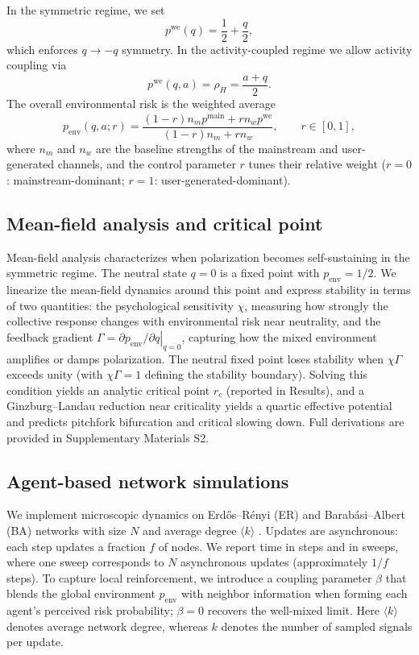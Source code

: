 \documentclass[11pt]{article}
\begin{document}
In the symmetric regime, we set
\begin{equation}
p^{\text{we}}(q)=\frac{1}{2}+\frac{q}{2},
\label{eq:pwe_sym}
\end{equation}
which enforces $q\to -q$ symmetry. In the activity-coupled regime we allow activity coupling via
\begin{equation}
p^{\text{we}}(q,a)=\rho_H=\frac{a+q}{2}.
\label{eq:pwe_asym}
\end{equation}
The overall environmental risk is the weighted average
\begin{equation}
p_{\text{env}}(q,a;r)=\frac{(1-r)n_m p^{\text{main}} + r n_w p^{\text{we}}}{(1-r)n_m + r n_w}, \qquad r\in[0,1],
\label{eq:penv}
\end{equation}
where $n_m$ and $n_w$ are the baseline strengths of the mainstream and user-generated channels, and the control parameter $r$ tunes their relative weight ($r=0$: mainstream-dominant; $r=1$: user-generated-dominant).

\subsection{Mean-field analysis and critical point}
Mean-field analysis characterizes when polarization becomes self-sustaining in the symmetric regime. The neutral state $q=0$ is a fixed point with $p_{\text{env}}=1/2$. We linearize the mean-field dynamics around this point and express stability in terms of two quantities: the psychological sensitivity $\chi$, measuring how strongly the collective response changes with environmental risk near neutrality, and the feedback gradient $\Gamma=\left.\partial p_{\text{env}}/\partial q\right|_{q=0}$, capturing how the mixed environment amplifies or damps polarization. The neutral fixed point loses stability when $\chi\Gamma$ exceeds unity (with $\chi\Gamma=1$ defining the stability boundary). Solving this condition yields an analytic critical point $r_c$ (reported in Results), and a Ginzburg--Landau reduction near criticality yields a quartic effective potential and predicts pitchfork bifurcation and critical slowing down. Full derivations are provided in Supplementary Materials S2.

\subsection{Agent-based network simulations}
We implement microscopic dynamics on Erd\H{o}s--R\'enyi (ER) and Barab\'asi--Albert (BA) networks with size $N$ and average degree $\langle k\rangle$ \citep{Erdos1959,Barabasi1999,PastorSatorras2015}. Updates are asynchronous: each step updates a fraction $f$ of nodes. We report time in steps and in sweeps, where one sweep corresponds to $N$ asynchronous updates (approximately $1/f$ steps). To capture local reinforcement, we introduce a coupling parameter $\beta$ that blends the global environment $p_{\text{env}}$ with neighbor information when forming each agent's perceived risk probability; $\beta=0$ recovers the well-mixed limit. Here $\langle k\rangle$ denotes average network degree, whereas $k$ denotes the number of sampled signals per update.
\end{document}
